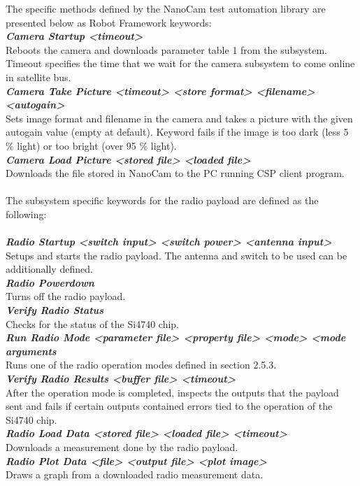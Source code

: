 \documentclass[english,12pt,a4paper,pdftex,elec,utf8]{aaltothesis}
\begin{document}
The specific methods defined by the NanoCam test automation library are presented below as Robot Framework keywords:\\
\textit{\textbf{Camera Startup	<timeout>}}\\
Reboots the camera and downloads parameter table 1 from the subsystem. Timeout specifies the time that we wait for the camera subsystem to come online in satellite bus.\\
\textit{\textbf{Camera Take Picture	<timeout> <store format> <filename> <autogain>}}\\
Sets image format and filename in the camera and takes a picture with the given autogain value (empty at default). Keyword fails if the image is too dark (less 5 \% light) or too bright (over 95 \% light).\\
\textit{\textbf{Camera Load Picture	<stored file> <loaded file>}}\\
Downloads the file stored in NanoCam to the PC running CSP client program.\\
\\
The subsystem specific keywords for the radio payload are defined as the following:\\
\\
\textit{\textbf{Radio Startup  <switch input> <switch power> <antenna input>}}\\
Setups and starts the radio payload. The antenna and switch to be used can be additionally defined.\\
\textit{\textbf{Radio Powerdown}}\\
Turns off the radio payload.\\
\textit{\textbf{Verify Radio Status}}\\
Checks for the status of the Si4740 chip.\\
\textit{\textbf{Run Radio Mode  <parameter file> <property file> <mode> <mode arguments}}\\
Runs one of the radio operation modes defined in section 2.5.3.\\
\textit{\textbf{Verify Radio Results  <buffer file> <timeout>}}\\
After the operation mode is completed, inspects the outputs that the payload sent and fails if certain outputs contained errors tied to the operation of the Si4740 chip. \\
\textit{\textbf{Radio Load Data  <stored file> <loaded file> <timeout>}}\\
Downloads a measurement done by the radio payload.\\
\textit{\textbf{Radio Plot Data  <file> <output file> <plot image>}}\\
Draws a graph from a downloaded radio measurement data.\\
  
\end{document}
